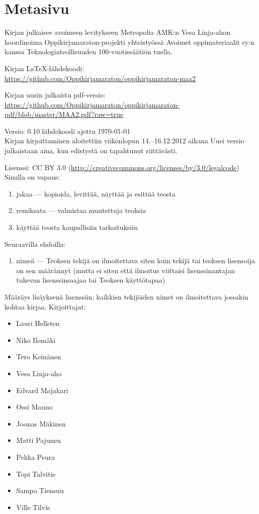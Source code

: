 \newpage
\section*{Metasivu}

Kirjan julkaisee avoimeen levitykseen Metropolia AMK:n Vesa Linja-ahon koordinoima Oppikirjamaraton-projekti yhteistyössä Avoimet oppimateriaalit ry:n kanssa Teknologiateollisuuden 100-vuotissäätiön tuella.

Kirjan LaTeX-lähdekoodi: \\
\url{https://github.com/Oppikirjamaraton/oppikirjamaraton-maa2}

Kirjan uusin julkaistu pdf-versio: \\
\url{https://github.com/Oppikirjamaraton/oppikirjamaraton-pdf/blob/master/MAA2.pdf?raw=true}

Versio: 0.10 \qquad lähdekoodi ajettu \today \\
Kirjan kirjoittaminen aloitettiin viikonlopun 14.--16.12.2012 aikana
Uusi versio julkaistaan aina, kun edistystä on tapahtunut riittävästi.

Lisenssi: CC BY 3.0 (\url{http://creativecommons.org/licenses/by/3.0/legalcode})\\
Sinulla on vapaus:
\begin{enumerate}
\item jakaa — kopioida, levittää, näyttää ja esittää teosta
\item remiksata — valmistaa muutettuja teoksia
\item käyttää teosta kaupallisiin tarkoituksiin
\end{enumerate}
Seuraavilla ehdoilla:
\begin{enumerate}
\item nimeä — Teoksen tekijä on ilmoitettava siten kuin tekijä tai teoksen lisensoija on sen määrännyt (mutta ei siten että ilmoitus viittaisi lisenssinantajan tukevan lisenssinsaajaa tai Teoksen käyttötapaa)
\end{enumerate}

Määräys lisäyksenä lisenssiin: kaikkien tekijöiden nimet on ilmoitettava jossakin kohtaa kirjaa.
Kirjoittajat:
\begin{itemize}
\item Lauri Hellsten
\item Niko Ilomäki
\item Tero Keinänen
\item Vesa Linja-aho
\item Edvard Majakari
\item Ossi Mauno
\item Joonas Mäkinen
\item Matti Pajunen
\item Pekka Peura
\item Topi Talvitie
\item Sampo Tiensuu
\item Ville Tilvis
\end{itemize}

